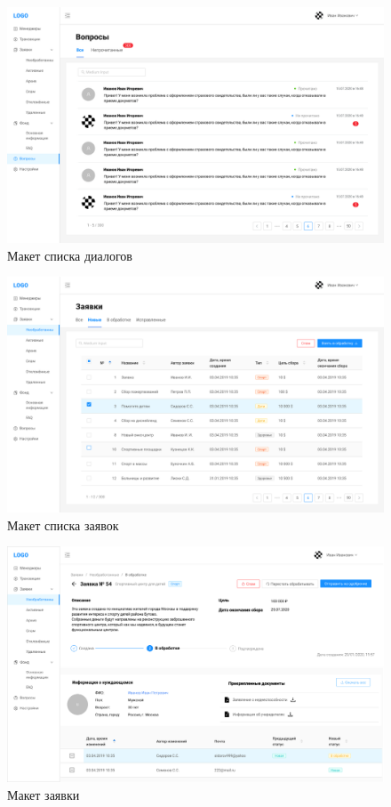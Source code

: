 \begin{figure}[H]
		\centering
		\includegraphics[width = 0.9\linewidth]{img/chats.png}
		\caption{Макет списка диалогов}
		\label{pic: applications}
\end{figure}

\begin{figure}[H]
		\centering
		\includegraphics[width = 0.9\linewidth]{img/new.png}
		\caption{Макет списка заявок}
		\label{pic: applications}
\end{figure}

\begin{figure}[H]
		\centering
		\includegraphics[width = 0.9\linewidth]{img/in-processing.png}
		\caption{Макет заявки}
		\label{pic: applications}
\end{figure}